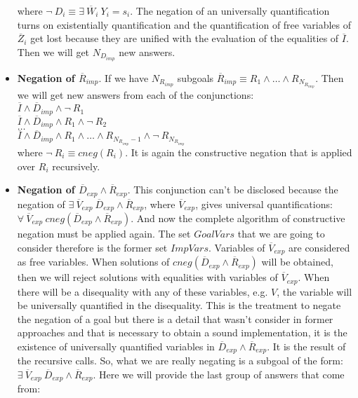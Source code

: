 \documentclass{llncs}
\begin{document}
\begin{itemize}
           where $ \neg~ D_i \equiv \exists~
           \overline{W}_i~ Y_i = s_i$. The negation of an universally
           quantification turns on existentially quantification and
           the quantification of free variables of $\overline{Z}_i$
           get lost because they are unified with the evaluation of
           the equalities of $\overline{I}$. Then we will get
           $N_{D_{imp}}$ new answers.


           \item {\bf Negation of $\overline{R}_{imp}$}. If we have
           $N_{R_{imp}}$ subgoals $\overline{R}_{imp} \equiv R_1
           \wedge \ldots \wedge R_{N_{R_{imp}}}$. Then we will get
           new answers from each of the conjunctions: \\

           $\overline{I} \wedge \overline{D}_{imp} \wedge \neg~ R_1 $ \\ 
           $\overline{I} \wedge \overline{D}_{imp} \wedge
           R_1 \wedge \neg~ R_2 $ \\ 
           $\ldots $ \\ 
           $\overline{I} \wedge \overline{D}_{imp} \wedge
           R_1 \wedge \ldots \wedge R_{N_{R_{imp}}-1} \wedge \neg~
           R_{N_{R_{imp}}}$ \\ 

           where $ \neg~ R_i \equiv cneg(R_i)$. It is again the
           constructive negation that is applied over $R_i$
           recursively.


           \item {\bf Negation of $\overline{D}_{exp} \wedge
           \overline{R}_{exp}$}. This conjunction can't be disclosed
           because the negation of $ \exists~ \overline{V}_{exp}~
           \overline{D}_{exp} \wedge \overline{R}_{exp}$, where
           $\overline{V}_{exp}$, gives universal quantifications:
           $\forall~ \overline{V}_{exp}~ cneg(\overline{D}_{exp}
           \wedge \overline{R}_{exp})$. And now the complete algorithm
           of constructive negation must be applied again. The set
           $GoalVars$ that we are going to consider therefore is the
           former set $ImpVars$. Variables of $\overline{V}_{exp}$ are
           considered as free variables. When solutions of
           $cneg(\overline{D}_{exp} \wedge \overline{R}_{exp})$ will
           be obtained, then we will reject solutions with equalities
           with variables of $\overline{V}_{exp}$. When there will be
           a disequality with any of these variables, e.g. $V$, the
           variable will be universally quantified in the disequality. This is the treatment to negate the negation of a goal but there is a detail that wasn't consider in former approaches and that is necessary to obtain a sound implementation, it is the existence of universally quantified variables in $\overline{D}_{exp} \wedge
           \overline{R}_{exp}$. It is the result of the recursive calls. So, what we are really negating is a subgoal of the form: $ \exists~ \overline{V}_{exp}~
           \overline{D}_{exp} \wedge \overline{R}_{exp}$. 
           Here we will provide the last group of answers that come
           from: \\


\end{itemize}
\end{document}
